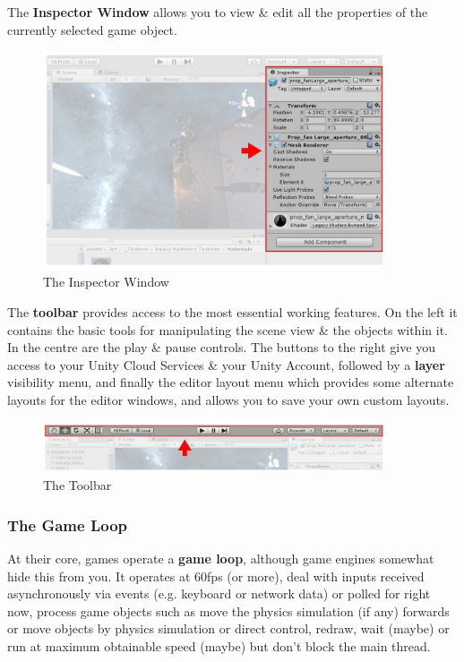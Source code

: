 \documentclass[a4paper,11pt]{article}
\begin{document}
The \textbf{Inspector Window} allows you to view \& edit all the properties of the currently selected game object.
\begin{figure}[H]
    \centering
    \includegraphics[width=0.9\textwidth]{./images/inspector_window.png}
    \caption{The Inspector Window}
\end{figure}

The \textbf{toolbar} provides access to the most essential working features. 
On the left it contains the basic tools for manipulating the scene view \& the objects within it. 
In the centre are the play \& pause controls. 
The buttons to the right give you access to your Unity Cloud Services \& your Unity Account, followed by a \textbf{layer}
visibility menu, and finally the editor layout menu which provides some alternate layouts for the editor windows, and allows 
you to save your own custom layouts.
\begin{figure}[H]
    \centering
    \includegraphics[width=0.9\textwidth]{./images/toolbar.png}
    \caption{The Toolbar}
\end{figure}

\subsubsection{The Game Loop}
At their core, games operate a \textbf{game loop}, although game engines somewhat hide this from you. 
It operates at 60fps (or more), deal with inputs received asynchronously via events (e.g. keyboard or network data) or 
polled for right now, process game objects such as move the physics simulation (if any) forwards or move objects by 
physics simulation or direct control, redraw, wait (maybe) or run at maximum obtainable speed (maybe) but don't block the 
main thread.
\end{document}

